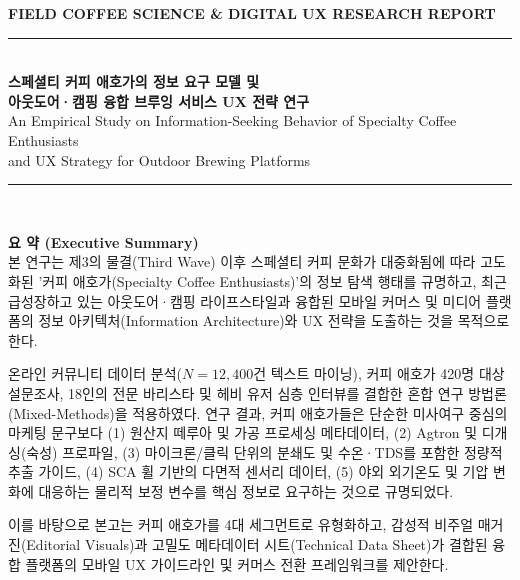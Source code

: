 \documentclass[10pt,a4paper]{article}
\begin{document}
\begin{titlepage}
    \centering
    \vspace*{1.5cm}
    
    {\Large\scshape\textcolor{AccentAmber}{\textbf{FIELD COFFEE SCIENCE \& DIGITAL UX RESEARCH REPORT}}}\\[0.8cm]
    
    \rule{\textwidth}{1.5pt}\\[0.5cm]
    {\LARGE\bfseries\color{EspressoDark} 스페셜티 커피 애호가의 정보 요구 모델 및\\아웃도어·캠핑 융합 브루잉 서비스 UX 전략 연구}\\[0.3cm]
    {\large\color{ForestGreen} An Empirical Study on Information-Seeking Behavior of Specialty Coffee Enthusiasts\\and UX Strategy for Outdoor Brewing Platforms}\\[0.4cm]
    \rule{\textwidth}{0.8pt}\\[1.5cm]
    
    \begin{tcolorbox}[colback=white,colframe=EspressoDark,width=0.92\textwidth]
    \textbf{\large 요 약 (Executive Summary)}\\[0.3cm]
    \small
    본 연구는 제3의 물결(Third Wave) 이후 스페셜티 커피 문화가 대중화됨에 따라 고도화된 '커피 애호가(Specialty Coffee Enthusiasts)'의 정보 탐색 행태를 규명하고, 최근 급성장하고 있는 아웃도어·캠핑 라이프스타일과 융합된 모바일 커머스 및 미디어 플랫폼의 정보 아키텍처(Information Architecture)와 UX 전략을 도출하는 것을 목적으로 한다.
    
    온라인 커뮤니티 데이터 분석($N=12,400$건 텍스트 마이닝), 커피 애호가 420명 대상 설문조사, 18인의 전문 바리스타 및 헤비 유저 심층 인터뷰를 결합한 혼합 연구 방법론(Mixed-Methods)을 적용하였다. 연구 결과, 커피 애호가들은 단순한 미사여구 중심의 마케팅 문구보다 (1) 원산지 떼루아 및 가공 프로세싱 메타데이터, (2) Agtron 및 디개싱(숙성) 프로파일, (3) 마이크론/클릭 단위의 분쇄도 및 수온·TDS를 포함한 정량적 추출 가이드, (4) SCA 휠 기반의 다면적 센서리 데이터, (5) 야외 외기온도 및 기압 변화에 대응하는 물리적 보정 변수를 핵심 정보로 요구하는 것으로 규명되었다.
    
    이를 바탕으로 본고는 커피 애호가를 4대 세그먼트로 유형화하고, 감성적 비주얼 매거진(Editorial Visuals)과 고밀도 메타데이터 시트(Technical Data Sheet)가 결합된 융합 플랫폼의 모바일 UX 가이드라인 및 커머스 전환 프레임워크를 제안한다.
    \end{tcolorbox}
    

\end{titlepage}
\end{document}
